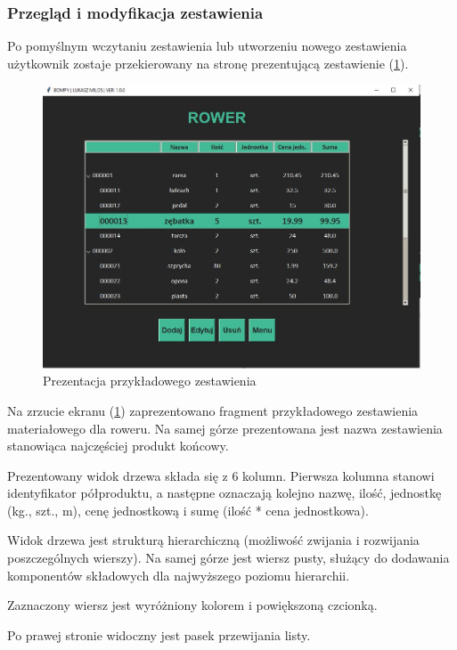 \documentclass[12pt,twoside]{article}
\begin{document}
\subsubsection*{Przegląd i modyfikacja zestawienia}
Po pomyślnym wczytaniu zestawienia lub utworzeniu nowego zestawienia użytkownik zostaje przekierowany na stronę prezentującą zestawienie (\ref{fig:app:bom_presentation}).

\begin{figure}[ht]
	\centering
	\includegraphics[width=\textwidth]{figures/app/bom_presentation.jpg}
	\caption{Prezentacja przykładowego zestawienia}
\label{fig:app:bom_presentation}
\end{figure}

Na zrzucie ekranu (\ref{fig:app:bom_presentation}) zaprezentowano fragment przykładowego zestawienia materiałowego dla roweru. Na samej górze prezentowana jest nazwa zestawienia stanowiąca najczęściej produkt końcowy.

Prezentowany widok drzewa składa się z 6 kolumn. Pierwsza kolumna stanowi identyfikator półproduktu, a następne oznaczają kolejno nazwę, ilość, jednostkę (kg., szt., m), cenę jednostkową i sumę (ilość * cena jednostkowa).

Widok drzewa jest strukturą hierarchiczną (możliwość zwijania i rozwijania poszczególnych wierszy). Na samej górze jest wiersz pusty, służący do dodawania komponentów składowych dla najwyższego poziomu hierarchii.

Zaznaczony wiersz jest wyróżniony kolorem i powiększoną czcionką.

Po prawej stronie widoczny jest pasek przewijania listy.
\end{document}

